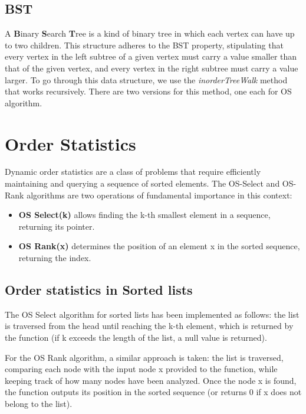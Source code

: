 \documentclass[11pt]{article}
\begin{document}
\subsection{BST}
A \textbf{B}inary \textbf{S}earch \textbf{T}ree is a kind of binary tree in which each vertex can have up to two children. This structure adheres to the BST property, stipulating that every vertex in the left subtree of a given vertex must carry a value smaller than that of the given vertex, and every vertex in the right subtree must carry a value larger. To go through this data structure, we use the \textit{inorderTreeWalk} method that works recursively. There are two versions for this method, one each for OS algorithm.
\section{Order Statistics}
Dynamic order statistics are a class of problems that require efficiently maintaining and querying a sequence of sorted elements. The OS-Select and OS-Rank algorithms are two operations of fundamental importance in this context:
\begin{itemize}
    \item \textbf{OS Select(k)} allows finding the k-th smallest element in a sequence, returning its pointer. 
    \item \textbf{OS Rank(x) }determines the position of an element x in the sorted sequence, returning the index.
\end{itemize}
\subsection{Order statistics in Sorted lists}
The OS Select algorithm for sorted lists has been implemented as follows: the list is traversed from the head until reaching the k-th element, which is returned by the function (if k exceeds the length of the list, a null value is returned).

For the OS Rank algorithm, a similar approach is taken: the list is traversed, comparing each node with the input node x provided to the function, while keeping track of how many nodes have been analyzed. Once the node x is found, the function outputs its position in the sorted sequence (or returns 0 if x does not belong to the list).
\end{document}
